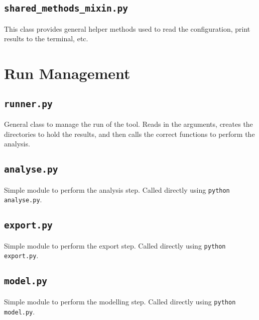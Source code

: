 

\newpage
\subsection{\texttt{shared\_methods\_mixin.py}}

This class provides general helper methods used to read the configuration, print results to the terminal, etc.



\newpage
\section{Run Management}

\subsection{\texttt{runner.py}}

General class to manage the run of the tool. Reads in the arguments, creates the directories to hold the results, and then calls the correct functions to perform the analysis.



\newpage
\subsection{\texttt{analyse.py}}

Simple module to perform the analysis step. Called directly using \texttt{python analyse.py}.



\newpage
\subsection{\texttt{export.py}}

Simple module to perform the export step. Called directly using \texttt{python export.py}.



\newpage
\subsection{\texttt{model.py}}

Simple module to perform the modelling step. Called directly using \texttt{python model.py}.




